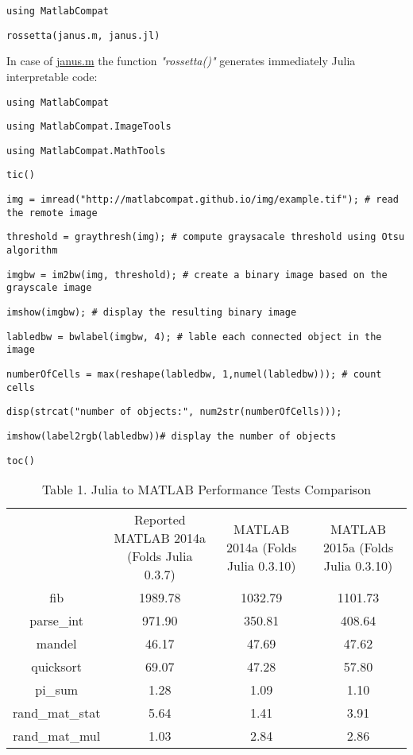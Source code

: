 \verb|using MatlabCompat|

\verb|rossetta(janus.m, janus.jl)|

In case of \href{https://github.com/MatlabCompat/MatlabCompat.jl/blob/dev/test/janus.m}{janus.m} the function \textit{"rossetta()"} generates immediately Julia interpretable code:

\verb|using MatlabCompat|

\verb|using MatlabCompat.ImageTools|

\verb|using MatlabCompat.MathTools|

\verb|tic()|

\verb|img = imread("http://matlabcompat.github.io/img/example.tif"); # read the remote image|

\verb|threshold = graythresh(img); # compute graysacale threshold using Otsu algorithm|

\verb|imgbw = im2bw(img, threshold); # create a binary image based on the grayscale image|

\verb|imshow(imgbw); # display the resulting binary image|

\verb|labledbw = bwlabel(imgbw, 4); # lable each connected object in the image|

\verb|numberOfCells = max(reshape(labledbw, 1,numel(labledbw))); # count cells|

\verb|disp(strcat("number of objects:", num2str(numberOfCells)));|

\verb|imshow(label2rgb(labledbw))# display the number of objects|

\verb|toc()|



\begin{table} 
    \begin{tabular}{ c c c c }
         & Reported MATLAB 2014a (Folds Julia 0.3.7) & MATLAB 2014a (Folds Julia 0.3.10) & MATLAB 2015a (Folds Julia 0.3.10) \\ 
        fib & 1989.78 & 1032.79 & 1101.73 \\ 
        parse\_int & 971.90 & 350.81 & 408.64 \\ 
        mandel & 46.17 & 47.69 & 47.62 \\ 
        quicksort & 69.07 & 47.28 & 57.80 \\ 
        pi\_sum & 1.28 & 1.09 & 1.10 \\ 
        rand\_mat\_stat & 5.64 & 1.41 & 3.91 \\ 
        rand\_mat\_mul & 1.03 & 2.84 & 2.86 \\ 
    \end{tabular} 
    \caption{Table 1. Julia to MATLAB Performance Tests Comparison} 
\end{table}

  
  
  
  
  
  
  
  
  
  
  
  
  
  
  
  
  
  
  